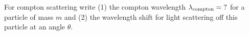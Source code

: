 

\vspace*{\fill}
\centering

For compton scattering write (1) the compton wavelength $\lambda_{\rm compton} = {\rm ?}$ for a particle of mass $m$ and (2) the wavelength shift for light scattering off this particle at an angle $\theta$.

\centering
\vspace*{\fill}

